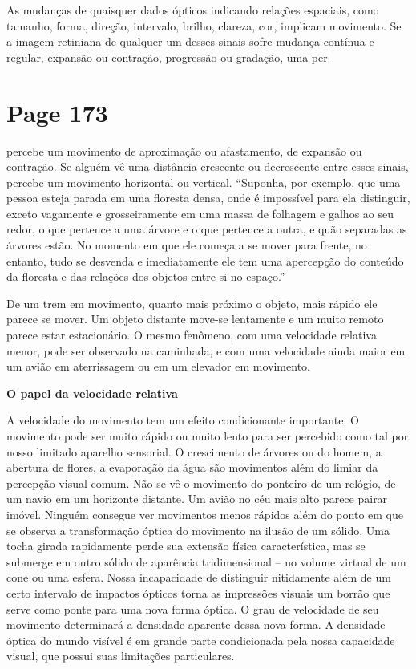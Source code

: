 \documentclass[a4paper]{article}
\begin{document}
As mudanças de quaisquer dados ópticos indicando relações espaciais, como tamanho, forma, direção, intervalo, brilho, clareza, cor, implicam movimento. Se a imagem retiniana de qualquer um desses sinais sofre mudança contínua e regular, expansão ou contração, progressão ou gradação, uma per-

\newpage
\section*{Page 173}

percebe um movimento de aproximação ou afastamento, de expansão ou contração. Se alguém vê uma distância crescente ou decrescente entre esses sinais, percebe um movimento horizontal ou vertical.
``Suponha, por exemplo, que uma pessoa esteja parada em uma floresta densa, onde é impossível para ela distinguir, exceto vagamente e grosseiramente em uma massa de folhagem e galhos ao seu redor, o que pertence a uma árvore e o que pertence a outra, e quão separadas as árvores estão. No momento em que ele começa a se mover para frente, no entanto, tudo se desvenda e imediatamente ele tem uma apercepção do conteúdo da floresta e das relações dos objetos entre si no espaço.''

De um trem em movimento, quanto mais próximo o objeto, mais rápido ele parece se mover. Um objeto distante move-se lentamente e um muito remoto parece estar estacionário. O mesmo fenômeno, com uma velocidade relativa menor, pode ser observado na caminhada, e com uma velocidade ainda maior em um avião em aterrissagem ou em um elevador em movimento.

\noindent\textbf{O papel da velocidade relativa}

A velocidade do movimento tem um efeito condicionante importante. O movimento pode ser muito rápido ou muito lento para ser percebido como tal por nosso limitado aparelho sensorial. O crescimento de árvores ou do homem, a abertura de flores, a evaporação da água são movimentos além do limiar da percepção visual comum. Não se vê o movimento do ponteiro de um relógio, de um navio em um horizonte distante. Um avião no céu mais alto parece pairar imóvel. Ninguém consegue ver movimentos menos rápidos além do ponto em que se observa a transformação óptica do movimento na ilusão de um sólido. Uma tocha girada rapidamente perde sua extensão física característica, mas se submerge em outro sólido de aparência tridimensional -- no volume virtual de um cone ou uma esfera. Nossa incapacidade de distinguir nitidamente além de um certo intervalo de impactos ópticos torna as impressões visuais um borrão que serve como ponte para uma nova forma óptica. O grau de velocidade de seu movimento determinará a densidade aparente dessa nova forma. A densidade óptica do mundo visível é em grande parte condicionada pela nossa capacidade visual, que possui suas limitações particulares.
\end{document}
